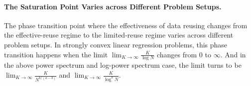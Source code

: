 

\paragraph{The Saturation Point Varies across Different Problem Setups.} The phase transition point where the effectiveness of data reusing changes from the effective-reuse regime to the limited-reuse regime varies across different problem setups.
In strongly convex linear regression problems, this phase transition happens when the limit $\lim_{K \to \infty}\frac{K}{\log N}$ changes from $0$ to $\infty$. And in the above power spectrum and log-power spectrum case, the limit turns to be $\lim_{K \to \infty}\frac{K}{N^{b/(a-b)}}$ and $\lim_{K \to \infty}\frac{K}{\log^bN}$.

